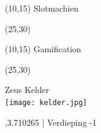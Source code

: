 \documentclass[11pt,a4paper]{beamer}
\begin{document}
\begin{frame}
  \begin{textblock}{60}(10,15)
    {\huge Slotmachien}
  \end{textblock}
  \begin{textblock}{20}(25,30)
  \end{textblock}
\end{frame}

\begin{frame}
  \begin{textblock}{60}(10,15)
    {\huge Gamification}
  \end{textblock}
  \begin{textblock}{20}(25,30)
  \end{textblock}

\end{frame}

\begin{frame}
  \begin{center}
    {\Huge{Zeus Kelder}}\\[5mm]

    \texttt{[image: kelder.jpg]}

    ,3.710265 | Verdieping -1
  \end{center}

\end{frame}
\end{document}
